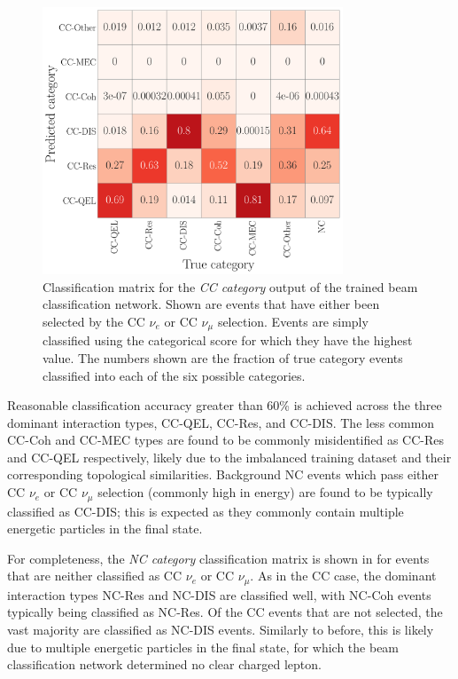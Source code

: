 \begin{figure} %
    \includegraphics[width=0.8\textwidth]{diagrams/7-results/final_cc_cat_confusion.pdf}
    \caption[Classification matrix for the CC category output of the beam classification network]
    {Classification matrix for the \emph{CC category} output of the trained beam classification
        network. Shown are events that have either been selected by the CC $\nu_{e}$ or CC
        $\nu_{\mu}$ selection. Events are simply classified using the categorical score for which
        they have the highest value. The numbers shown are the fraction of true category events
        classified into each of the six possible categories.}
    \label{fig:final_cc_cat_confusion}
\end{figure}

Reasonable classification accuracy greater than 60\% is achieved across the three dominant
interaction types, CC-QEL, CC-Res, and CC-DIS. The less common CC-Coh and CC-MEC types are found
to be commonly misidentified as CC-Res and CC-QEL respectively, likely due to the imbalanced
training dataset and their corresponding topological similarities. Background NC events which pass
either CC $\nu_{e}$ or CC $\nu_{\mu}$ selection (commonly high in energy) are found to be
typically classified as CC-DIS; this is expected as they commonly contain multiple energetic
particles in the final state.

For completeness, the \emph{NC category} classification matrix is shown in
 for events that are neither classified as CC $\nu_{e}$ or
CC $\nu_{\mu}$. As in the CC case, the dominant interaction types NC-Res and NC-DIS are classified
well, with NC-Coh events typically being classified as NC-Res. Of the CC events that are not
selected, the vast majority are classified as NC-DIS events. Similarly to before, this is likely
due to multiple energetic particles in the final state, for which the beam classification network
determined no clear charged lepton.

